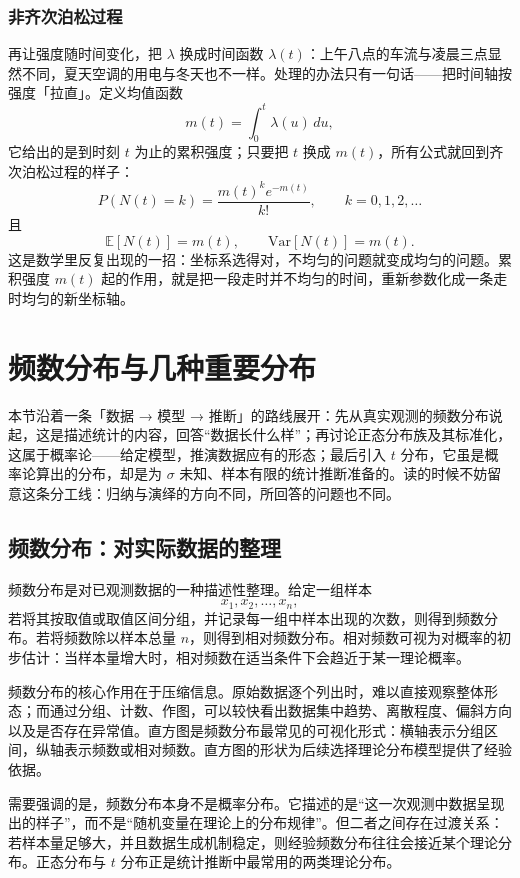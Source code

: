 \documentclass[UTF8]{ctexbook}
\begin{document}
\subsubsection{非齐次泊松过程}

再让强度随时间变化，把 $\lambda$ 换成时间函数 $\lambda(t)$：上午八点的车流与凌晨三点显然不同，夏天空调的用电与冬天也不一样。处理的办法只有一句话——把时间轴按强度「拉直」。定义均值函数
\[
m(t)=\int_0^t \lambda(u)\,du,
\]
它给出的是到时刻 $t$ 为止的累积强度；只要把 $t$ 换成 $m(t)$，所有公式就回到齐次泊松过程的样子：
\[
P(N(t)=k)=\frac{m(t)^k e^{-m(t)}}{k!},\qquad k=0,1,2,\dots
\]
且
\[
\mathbb{E}[N(t)]=m(t),\qquad \mathrm{Var}[N(t)]=m(t).
\]
这是数学里反复出现的一招：坐标系选得对，不均匀的问题就变成均匀的问题。累积强度 $m(t)$ 起的作用，就是把一段走时并不均匀的时间，重新参数化成一条走时均匀的新坐标轴。

\section{频数分布与几种重要分布}

本节沿着一条「数据 → 模型 → 推断」的路线展开：先从真实观测的频数分布说起，这是描述统计的内容，回答“数据长什么样”；再讨论正态分布族及其标准化，这属于概率论——给定模型，推演数据应有的形态；最后引入 $t$ 分布，它虽是概率论算出的分布，却是为 $\sigma$ 未知、样本有限的统计推断准备的。读的时候不妨留意这条分工线：归纳与演绎的方向不同，所回答的问题也不同。

\subsection{频数分布：对实际数据的整理}

频数分布是对已观测数据的一种描述性整理。给定一组样本
\[
x_1,x_2,\dots,x_n,
\]
若将其按取值或取值区间分组，并记录每一组中样本出现的次数，则得到频数分布。若将频数除以样本总量 $n$，则得到相对频数分布。相对频数可视为对概率的初步估计：当样本量增大时，相对频数在适当条件下会趋近于某一理论概率。

频数分布的核心作用在于压缩信息。原始数据逐个列出时，难以直接观察整体形态；而通过分组、计数、作图，可以较快看出数据集中趋势、离散程度、偏斜方向以及是否存在异常值。直方图是频数分布最常见的可视化形式：横轴表示分组区间，纵轴表示频数或相对频数。直方图的形状为后续选择理论分布模型提供了经验依据。

需要强调的是，频数分布本身不是概率分布。它描述的是“这一次观测中数据呈现出的样子”，而不是“随机变量在理论上的分布规律”。但二者之间存在过渡关系：若样本量足够大，并且数据生成机制稳定，则经验频数分布往往会接近某个理论分布。正态分布与 $t$ 分布正是统计推断中最常用的两类理论分布。
\end{document}
